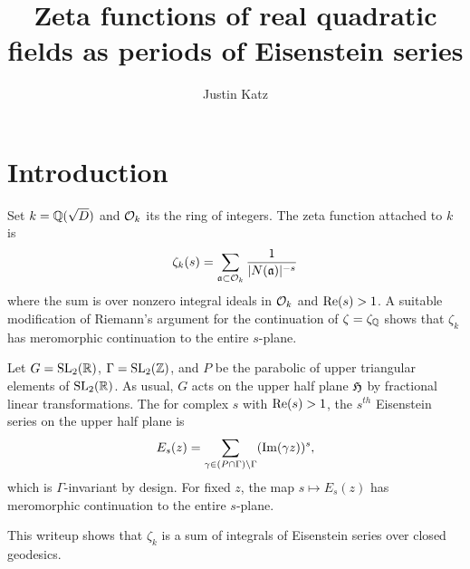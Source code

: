 \documentclass[11pt]{amsart}
\title{Zeta functions of real quadratic fields as periods of Eisenstein series}
\author{Justin Katz}
\begin{document}
\maketitle

\section{Introduction}

Set $k=\mathbb{Q}(\sqrt{D})$ and $\mathcal{O}_k$ its the ring of integers. The zeta function attached to $k$ is
\begin{equation*}
\zeta_k(s)=\sum_{\mathfrak{a}\subset \mathcal{O}_k} \frac{1}{|N(\mathfrak{a})|^{-s}}
\end{equation*}
where the sum is over nonzero integral ideals in $\mathcal{O}_k$ and $\operatorname{Re}(s)>1$. A suitable modification of Riemann's argument for the continuation of $\zeta=\zeta_{\mathbb{Q}}$ shows that $\zeta_k$ has meromorphic continuation to the entire $s$-plane.

Let $G=\operatorname{SL}_2(\mathbb{R})$, $\Gamma=\operatorname{SL}_2(\mathbb{Z})$, and $P$ be the parabolic of upper triangular elements of $\operatorname{SL}_2(\mathbb{R})$. As usual, $G$ acts on the upper half plane $\mathfrak{H}$ by fractional linear transformations. The for complex $s$ with $\operatorname{Re}(s)>1$, the $s^{th}$ Eisenstein series on the upper half plane is
\begin{equation*}
E_s(z)=\sum_{\gamma \in (P\cap \Gamma)\backslash \Gamma} (\operatorname{Im}(\gamma z))^s,
\end{equation*}
which is $\Gamma$-invariant by design. For fixed $z$, the map $s\mapsto E_s(z)$ has meromorphic continuation to the entire $s$-plane.

This writeup shows that $\zeta_k$ is a sum of integrals of Eisenstein series over closed geodesics.
\end{document}
